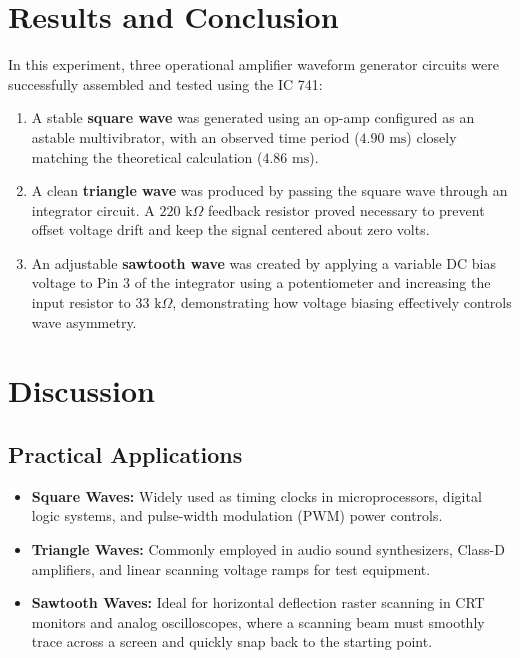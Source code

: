\documentclass[11pt,a4paper]{article}
\begin{document}
\section{Results and Conclusion}
In this experiment, three operational amplifier waveform generator circuits were successfully assembled and tested using the IC 741:
\begin{enumerate}
    \item A stable \textbf{square wave} was generated using an op-amp configured as an astable multivibrator, with an observed time period ($4.90\text{ ms}$) closely matching the theoretical calculation ($4.86\text{ ms}$).
    \item A clean \textbf{triangle wave} was produced by passing the square wave through an integrator circuit. A $220\text{ k}\Omega$ feedback resistor proved necessary to prevent offset voltage drift and keep the signal centered about zero volts.
    \item An adjustable \textbf{sawtooth wave} was created by applying a variable DC bias voltage to Pin 3 of the integrator using a potentiometer and increasing the input resistor to $33\text{ k}\Omega$, demonstrating how voltage biasing effectively controls wave asymmetry.
\end{enumerate}

\section{Discussion}

\subsection{Practical Applications}
\begin{itemize}
    \item \textbf{Square Waves:} Widely used as timing clocks in microprocessors, digital logic systems, and pulse-width modulation (PWM) power controls.
    \item \textbf{Triangle Waves:} Commonly employed in audio sound synthesizers, Class-D amplifiers, and linear scanning voltage ramps for test equipment.
    \item \textbf{Sawtooth Waves:} Ideal for horizontal deflection raster scanning in CRT monitors and analog oscilloscopes, where a scanning beam must smoothly trace across a screen and quickly snap back to the starting point.
\end{itemize}
\end{document}
